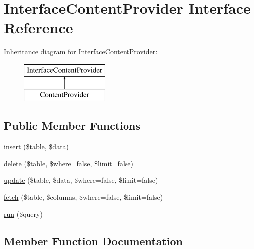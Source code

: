\hypertarget{interface_david_fricker_1_1_data_abstracter_1_1_interface_content_provider}{}\section{Interface\+Content\+Provider Interface Reference}
\label{interface_david_fricker_1_1_data_abstracter_1_1_interface_content_provider}
Inheritance diagram for Interface\+Content\+Provider\+:\begin{figure}[H]
\begin{center}
\leavevmode
\includegraphics[height=2.000000cm]{interface_david_fricker_1_1_data_abstracter_1_1_interface_content_provider}
\end{center}
\end{figure}
\subsection*{Public Member Functions}
\begin{DoxyCompactItemize}
\item 
\hyperlink{interface_david_fricker_1_1_data_abstracter_1_1_interface_content_provider_ae08b1d097cd6b6e5982ef0e0fd71de26}{insert} (\$table, \$data)
\item 
\hyperlink{interface_david_fricker_1_1_data_abstracter_1_1_interface_content_provider_a2793579c78ddc2f9f2428185305ddc88}{delete} (\$table, \$where=false, \$limit=false)
\item 
\hyperlink{interface_david_fricker_1_1_data_abstracter_1_1_interface_content_provider_a085afde80e8bee8ebfa89775b4d1446f}{update} (\$table, \$data, \$where=false, \$limit=false)
\item 
\hyperlink{interface_david_fricker_1_1_data_abstracter_1_1_interface_content_provider_ab2ab0042470a76f29458dff737c7769f}{fetch} (\$table, \$columns, \$where=false, \$limit=false)
\item 
\hyperlink{interface_david_fricker_1_1_data_abstracter_1_1_interface_content_provider_ae0a8b5efb674b9222fe1a21014d078ea}{run} (\$query)
\end{DoxyCompactItemize}


\subsection{Member Function Documentation}
\mbox{\label{interface_david_fricker_1_1_data_abstracter_1_1_interface_content_provider_a2793579c78ddc2f9f2428185305ddc88}} 
